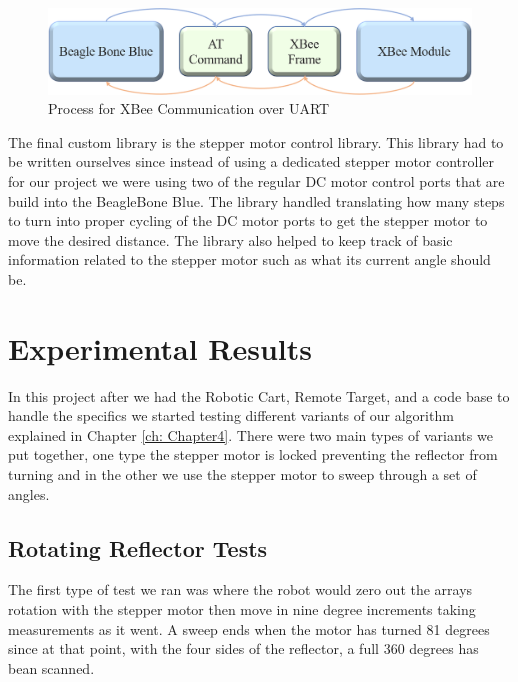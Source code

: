 \begin{figure}[H]
  \centering
  \includegraphics[width=\textwidth]{figs/img/Command Process Diagram.png}
  \caption{Process for XBee Communication over UART}
  \label{fig:CommandProcessDiagram}
\end{figure}

\vspace*{12pt}
\noindent
The final custom library is the stepper motor control library. This library had to be written ourselves since instead of using a dedicated stepper motor controller for our project we were using two of the regular DC motor control ports that are build into the BeagleBone Blue. The library handled translating how many steps to turn into proper cycling of the DC motor ports to get the stepper motor to move the desired distance.  The library also helped to keep track of basic information related to the stepper motor such as what its current angle should be.

\section{Experimental Results}
\label{sec:Experimental Results}

In this project after we had the Robotic Cart, Remote Target, and a code base to handle the specifics we started testing different variants of our algorithm explained in Chapter \ref{ch: Chapter4}. There were two main types of variants we put together, one type the stepper motor is locked preventing the reflector from turning and in the other we use the stepper motor to sweep through a set of angles.

\subsection{Rotating Reflector Tests}

The first type of test we ran was where the robot would zero out the arrays rotation with the stepper motor then move in nine degree increments taking measurements as it went. A sweep ends when the motor has turned 81 degrees since at that point, with the four sides of the reflector, a full 360 degrees has bean scanned.

